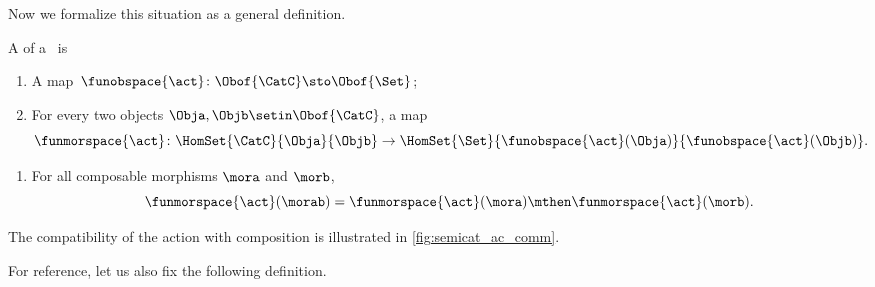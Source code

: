 Now we formalize this situation as a general definition.

\begin{ctdefinition}
    \label{def:semicategory-action}
    A  of a ~\CatC is

    \constit
    \begin{enumerate}
        \item A map~$\funobspace{\act} \colon \Obof{\CatC} \sto \Obof{\Set}$;
        \item For every two objects $\Obja, \Objb \setin \Obof{\CatC}$, a map
              \begin{equation}
                  \funmorspace{\act} \colon \HomSet{\CatC}{\Obja}{\Objb} \to \HomSet{\Set}{ \funobspace{\act}(\Obja)}{\funobspace{\act}(\Objb)}.
              \end{equation}
    \end{enumerate}

    \condit

    \begin{enumerate}
        \item For all composable morphisms $\mora$ and $\morb$,
              \begin{equation}
                  \funmorspace{\act}(\morab) = \funmorspace{\act}(\mora) \mthen \funmorspace{\act}(\morb).
              \end{equation}
    \end{enumerate}
\end{ctdefinition}

The compatibility of the action with composition is illustrated in \cref{fig:semicat_ac_comm}.

\begin{marginfigure}
    \centering
    \caption{}
    \label{fig:semicat_ac_comm}
\end{marginfigure}

For reference, let us also fix the following definition.

